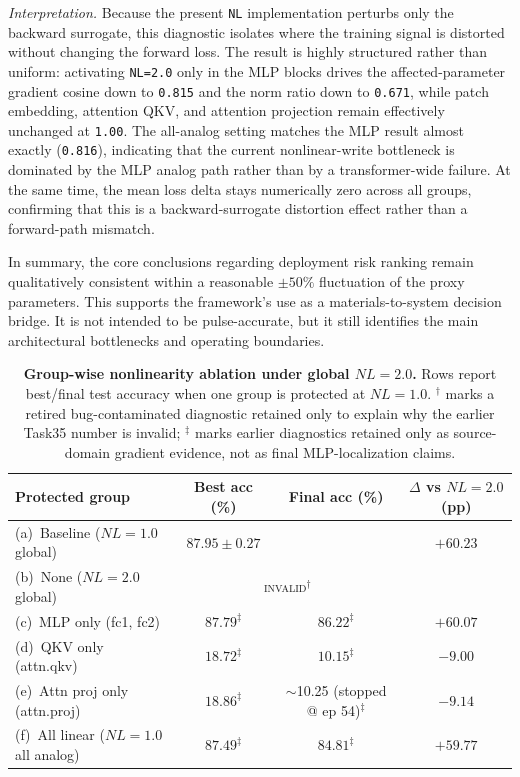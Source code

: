 \textit{Interpretation.} Because the present \texttt{NL} implementation perturbs only the backward surrogate, this diagnostic isolates where the training signal is distorted without changing the forward loss. The result is highly structured rather than uniform: activating \texttt{NL=2.0} only in the MLP blocks drives the affected-parameter gradient cosine down to \texttt{0.815} and the norm ratio down to \texttt{0.671}, while patch embedding, attention QKV, and attention projection remain effectively unchanged at \texttt{1.00}. The all-analog setting matches the MLP result almost exactly (\texttt{0.816}), indicating that the current nonlinear-write bottleneck is dominated by the MLP analog path rather than by a transformer-wide failure. At the same time, the mean loss delta stays numerically zero across all groups, confirming that this is a backward-surrogate distortion effect rather than a forward-path mismatch.

In summary, the core conclusions regarding deployment risk ranking remain qualitatively consistent within a reasonable $\pm 50\%$ fluctuation of the proxy parameters. This supports the framework's use as a materials-to-system decision bridge. It is not intended to be pulse-accurate, but it still identifies the main architectural bottlenecks and operating boundaries.


\begin{table}[ht]
    \centering
    \caption{\textbf{Group-wise nonlinearity ablation under global $NL=2.0$.} Rows report best/final test accuracy when one group is protected at $NL=1.0$. $^\dagger$ marks a retired bug-contaminated diagnostic retained only to explain why the earlier Task35 number is invalid; $^\ddagger$ marks earlier diagnostics retained only as source-domain gradient evidence, not as final MLP-localization claims.}
    \label{tab:supp-nl-ablation}
    \small
    \setlength{\tabcolsep}{5pt}
    \begin{tabular}{@{}lccc@{}}
        \toprule
        Protected group & Best acc (\%) & Final acc (\%) & $\Delta$ vs $NL=2.0$ (pp) \\
        \midrule
        (a)~Baseline ($NL=1.0$ global) & $87.95\pm0.27$ & \notrun{} & $+60.23$ \\
        (b)~None ($NL=2.0$ global) & \multicolumn{2}{c}{\textsc{invalid}$^\dagger$} & \notrun{} \\
        (c)~MLP only (fc1, fc2) & $87.79^\ddagger$ & $86.22^\ddagger$ & $+60.07$ \\
        (d)~QKV only (attn.qkv) & $18.72^\ddagger$ & $10.15^\ddagger$ & $-9.00$ \\
        (e)~Attn proj only (attn.proj) & $18.86^\ddagger$ & $\sim$10.25 (stopped @ ep 54)$^\ddagger$ & $-9.14$ \\
        (f)~All linear ($NL=1.0$ all analog) & $87.49^\ddagger$ & $84.81^\ddagger$ & $+59.77$ \\
        \bottomrule
    \end{tabular}
\end{table}

